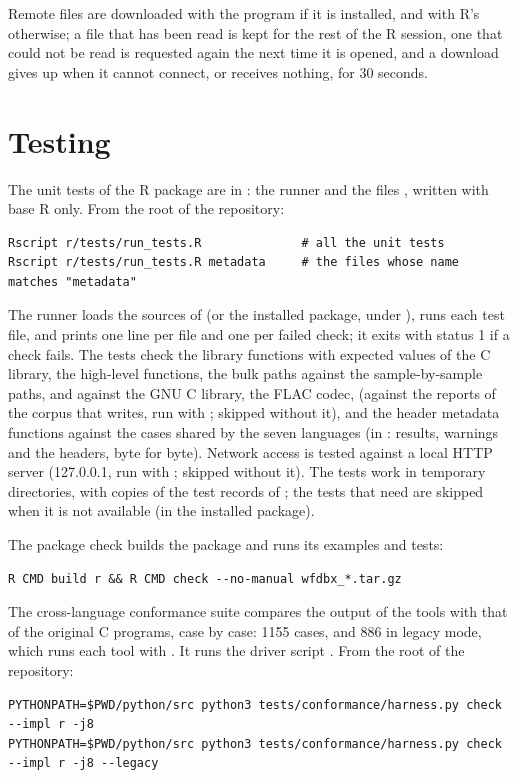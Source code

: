 Remote files are downloaded with the program  if it is installed, and with R's
 otherwise; a file that has been read is kept for the rest of the R session, one
that could not be read is requested again the next time it is opened, and a download gives
up when it cannot connect, or receives nothing, for 30 seconds.

\section{Testing}
\label{sec:r-testing}

The unit tests of the R package are in : the runner  and
the files , written with base R only. From the root of the
repository:

\begin{lstlisting}[style=shell]
Rscript r/tests/run_tests.R              # all the unit tests
Rscript r/tests/run_tests.R metadata     # the files whose name matches "metadata"
\end{lstlisting}

The runner loads the sources of  (or the installed package, under ), runs each test file, and prints one line per file and one per failed check; it
exits with status 1 if a check fails. The tests check the library functions with expected
values of the C library, the high-level functions, the bulk paths against the
sample-by-sample paths,  and  against the GNU C library, the
FLAC codec,  (against the reports of the corpus that
 writes, run with ; skipped without it),
and the header metadata functions against the cases
shared by the seven languages (in : results, warnings and the
headers, byte for byte). Network access is tested against a local HTTP server
(127.0.0.1, run with ; skipped without it). The tests work in temporary
directories, with copies of the test records of ; the tests that need
 are skipped when it is not available (in the installed package).

The package check builds the package and runs its examples and tests:

\begin{lstlisting}[style=shell]
R CMD build r && R CMD check --no-manual wfdbx_*.tar.gz
\end{lstlisting}

The cross-language conformance suite compares the output of the tools with that of the
original C programs, case by case: 1155 cases, and 886 in legacy mode, which runs each
tool with . It runs the driver script . From the
root of the repository:

\begin{lstlisting}[style=shell]
PYTHONPATH=$PWD/python/src python3 tests/conformance/harness.py check --impl r -j8
PYTHONPATH=$PWD/python/src python3 tests/conformance/harness.py check --impl r -j8 --legacy
\end{lstlisting}
